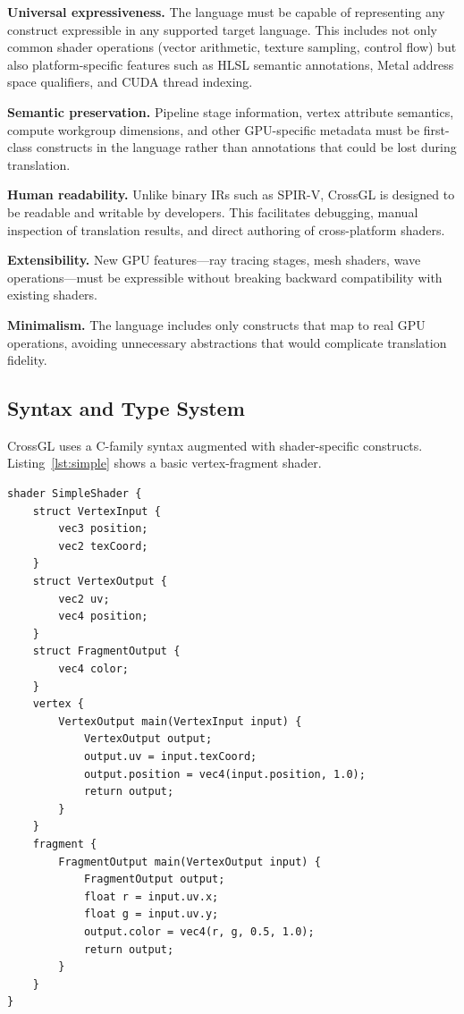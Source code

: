 \documentclass{svproc}
\begin{document}
\textbf{Universal expressiveness.} The language must be capable of representing any construct expressible in any supported target language. This includes not only common shader operations (vector arithmetic, texture sampling, control flow) but also platform-specific features such as HLSL semantic annotations, Metal address space qualifiers, and CUDA thread indexing.

\textbf{Semantic preservation.} Pipeline stage information, vertex attribute semantics, compute workgroup dimensions, and other GPU-specific metadata must be first-class constructs in the language rather than annotations that could be lost during translation.

\textbf{Human readability.} Unlike binary IRs such as SPIR-V, CrossGL is designed to be readable and writable by developers. This facilitates debugging, manual inspection of translation results, and direct authoring of cross-platform shaders.

\textbf{Extensibility.} New GPU features---ray tracing stages, mesh shaders, wave operations---must be expressible without breaking backward compatibility with existing shaders.

\textbf{Minimalism.} The language includes only constructs that map to real GPU operations, avoiding unnecessary abstractions that would complicate translation fidelity.

\subsection{Syntax and Type System}

CrossGL uses a C-family syntax augmented with shader-specific constructs. Listing~\ref{lst:simple} shows a basic vertex-fragment shader.

\begin{lstlisting}[language=CrossGL, caption={A simple CrossGL vertex-fragment shader}, label={lst:simple}]
shader SimpleShader {
    struct VertexInput {
        vec3 position;
        vec2 texCoord;
    }
    struct VertexOutput {
        vec2 uv;
        vec4 position;
    }
    struct FragmentOutput {
        vec4 color;
    }
    vertex {
        VertexOutput main(VertexInput input) {
            VertexOutput output;
            output.uv = input.texCoord;
            output.position = vec4(input.position, 1.0);
            return output;
        }
    }
    fragment {
        FragmentOutput main(VertexOutput input) {
            FragmentOutput output;
            float r = input.uv.x;
            float g = input.uv.y;
            output.color = vec4(r, g, 0.5, 1.0);
            return output;
        }
    }
}
\end{lstlisting}
\end{document}
